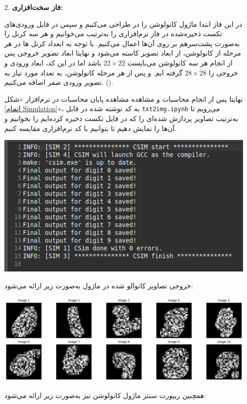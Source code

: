 \newpage
\begin{qsolve}
	\begin{enumerate}
		\item [2. ]
		\textbf{فاز سخت‌افزاری:}
		
		در این فاز ابتدا ماژول کانولوشن را در  طراحی می‌کنیم و سپس در فایل  ورودی‌های تکست ذخیره‌شده در فاز نرم‌افزاری را به‌ترتیب می‌خوانیم و هر سه کرنل را به‌صورت پشت‌سرهم بر روی آن‌ها اعمال می‌کنیم. با توجه به ابعداد کرنل ها در هر مرحله از کانولوشن، از ابعاد تصویر کاسته می‌شود و نهایتا ابعاد تصویر خروجی پس از انجام هر سه کانولوشن می‌بایست $22 \times 22 $ باشد اما در این کد، ابعاد ورودی و خروجی را $28 \times 28 $ گرفته ایم. و پس از هر مرحله کانولوشن، به تعداد مورد تیاز به تصویر ورودی صفر اضافه می‌کنیم. ().
		
		نهایتا پس از انجام محاسبات و مشاهده مشاهده پایان محاسبات در نرم‌افزار «شکل \ref{اتمام Simulation}»، به کد نوشته شده در فایل \texttt{txt2img.ipynb} می‌رویم تا به‌ترتیب تصاویر پردازش شده‌ای را که در فایل تکست ذخیره کرده‌ایم را بخوانیم و آن‌ها را نمایش دهیم تا بتوانیم با کد نرم‌افزاری مقایسه کنیم. 
		\begin{center}
			\includegraphics*[width=0.6\linewidth]{pics/img4.png}
			\label{اتمام Simulation}
		\end{center}
		
		
		خروجی تصاویر کانوالو شده در ماژول  به‌صورت زیر ارائه می‌شود:
		
		\begin{center}
			\includegraphics*[width=1\linewidth]{pics/img5.png}
			\label{خروجی HLS}
		\end{center}
		
		همچنین ریپورت سنتز ماژول کانولوشن نیز به‌صورت زیر ارائه می‌شود:
		
	\end{enumerate}
\end{qsolve}

